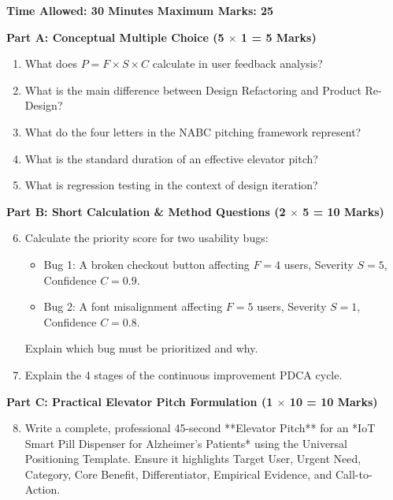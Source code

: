 \begin{chaptertest}
\textbf{Time Allowed: 30 Minutes \hfill Maximum Marks: 25}

\vspace{0.4cm}
\noindent\textbf{Part A: Conceptual Multiple Choice (5 $\times$ 1 = 5 Marks)}
\begin{enumerate}[leftmargin=1.2em, itemsep=2pt]
    \item What does $P = F \times S \times C$ calculate in user feedback analysis?
    \item What is the main difference between Design Refactoring and Product Re-Design?
    \item What do the four letters in the NABC pitching framework represent?
    \item What is the standard duration of an effective elevator pitch?
    \item What is regression testing in the context of design iteration?
\end{enumerate}

\vspace{0.3cm}
\noindent\textbf{Part B: Short Calculation \& Method Questions (2 $\times$ 5 = 10 Marks)}
\begin{enumerate}[leftmargin=1.2em, itemsep=4pt]
    \setcounter{enumi}{5}
    \item Calculate the priority score for two usability bugs:
    \begin{itemize}
        \item Bug 1: A broken checkout button affecting $F=4$ users, Severity $S=5$, Confidence $C=0.9$.
        \item Bug 2: A font misalignment affecting $F=5$ users, Severity $S=1$, Confidence $C=0.8$.
    \end{itemize}
    Explain which bug must be prioritized and why.
    \item Explain the 4 stages of the continuous improvement PDCA cycle.
\end{enumerate}

\vspace{0.3cm}
\noindent\textbf{Part C: Practical Elevator Pitch Formulation (1 $\times$ 10 = 10 Marks)}
\begin{enumerate}[leftmargin=1.2em, itemsep=4pt]
    \setcounter{enumi}{7}
    \item Write a complete, professional 45-second **Elevator Pitch** for an *IoT Smart Pill Dispenser for Alzheimer's Patients* using the Universal Positioning Template. Ensure it highlights Target User, Urgent Need, Category, Core Benefit, Differentiator, Empirical Evidence, and Call-to-Action.
\end{enumerate}
\end{chaptertest}


